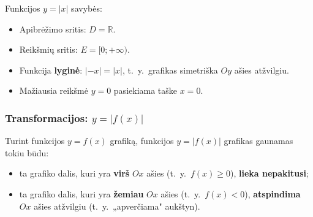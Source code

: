 \begin{remark}
Funkcijos $y = |x|$ savybės:
\begin{itemize}
    \item Apibrėžimo sritis: $D = \mathbb{R}$.
    \item Reikšmių sritis: $E = [0; +\infty)$.
    \item Funkcija \textbf{lyginė}: $|{-x}| = |x|$, t.~y.\ grafikas simetriška $Oy$ ašies atžvilgiu.
    \item Mažiausia reikšmė $y = 0$ pasiekiama taške $x = 0$.
\end{itemize}
\end{remark}

\subsubsection*{Transformacijos: \texorpdfstring{$y = |f(x)|$}{y = |f(x)|}}

Turint funkcijos $y = f(x)$ grafiką, funkcijos $y = |f(x)|$ grafikas gaunamas tokiu būdu:
\begin{itemize}
    \item ta grafiko dalis, kuri yra \textbf{virš} $Ox$ ašies (t.~y.\ $f(x) \geq 0$), \textbf{lieka nepakitusi};
    \item ta grafiko dalis, kuri yra \textbf{žemiau} $Ox$ ašies (t.~y.\ $f(x) < 0$), \textbf{atspindima} $Ox$ ašies atžvilgiu (t.~y.\ „apverčiama" aukštyn).
\end{itemize}

